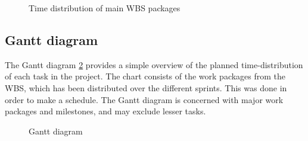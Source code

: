 \begin{center}
  \begin{figure}[ht!]
    \caption{Time distribution of main WBS packages}
    \label{fig:Main structure diagram}
  \end{figure}
\end{center}

\subsection{Gantt diagram}
\label{subsec:process_and_methodology-resource_management-gantt_diagram}

The Gantt diagram \ref{fig:gantt} provides a simple overview of the planned time-distribution of each task in the project. The chart consists of the work packages from the WBS, which has been distributed over the different sprints. This was done in order to make a schedule. The Gantt diagram is concerned with major work packages and milestones, and may exclude lesser tasks.

\begin{center}
  \begin{figure}[ht!]
    \caption{Gantt diagram}
    \label{fig:gantt}
  \end{figure}
\end{center}

